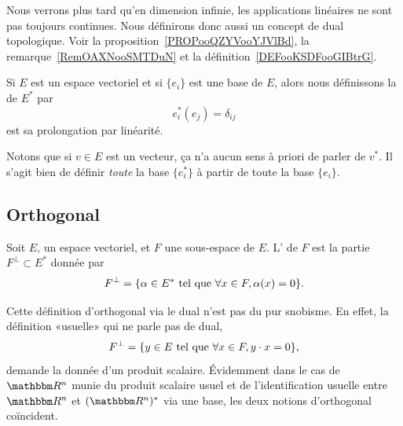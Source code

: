 Nous verrons plus tard qu'en dimension infinie, les applications linéaires ne sont pas toujours continues. Nous définirons donc aussi un concept de dual topologique. Voir la proposition~\ref{PROPooQZYVooYJVlBd}, la remarque~\ref{RemOAXNooSMTDuN} et la définition~\ref{DEFooKSDFooGIBtrG}.

\begin{definition}      \label{DEFooTMSEooZFtsqa}
    Si \( E\) est un espace vectoriel et si \( \{ e_i \}\) est une base de \( E\), alors nous définissons la  de \( E^*\) par
    \begin{equation}
        e_i^*(e_j)=\delta_{ij}
    \end{equation}
    est sa prolongation par linéarité.
\end{definition}
Notons que si \( v\in E\) est un vecteur, ça n'a aucun sens à priori de parler de \( v^*\). Il s'agit bien de définir \emph{toute} la base \( \{ e_i^* \}\) à partir de toute la base \( \{ e_i \}\).

\subsection{Orthogonal}

\begin{definition}      \label{DEFooEQSMooHVzbfz}
    Soit \( E\), un espace vectoriel, et \( F\) une sous-espace de \( E\). L' de \( F\) est la partie \( F^{\perp}\subset E^*\) donnée par
    \begin{equation}    \label{Eqiiyple}
        F^{\perp}=\{ \alpha\in E^*\text{ tel que } \forall x\in F,\alpha(x)=0 \}.
    \end{equation}
\end{definition}

Cette définition d'orthogonal via le dual n'est pas du pur snobisme. En effet, la définition «usuelle» qui ne parle pas de dual,
\begin{equation}
    F^{\perp}=\{ y\in E\text{ tel que } \forall x\in F,y\cdot x=0 \},
\end{equation}
demande la donnée d'un produit scalaire. Évidemment dans le cas de \( \eR^n\) munie du produit scalaire usuel et de l'identification usuelle entre \( \eR^n\) et \( (\eR^n)^*\) via une base, les deux notions d'orthogonal coïncident.

